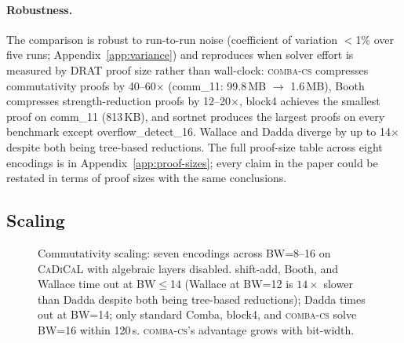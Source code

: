 \documentclass[a4paper]{ceurart}
\newcommand{\combacs}{\textsc{comba-cs}\xspace}
\newcommand{\cadical}{\textsc{CaDiCaL}\xspace}
\begin{document}
\paragraph{Robustness.}
The comparison is robust to run-to-run noise (coefficient of
variation $<$1\% over five runs; Appendix~\ref{app:variance}) and
reproduces when solver effort is measured by DRAT proof size
rather than wall-clock: \combacs compresses commutativity proofs
by 40--60$\times$ (comm\_11: 99.8\,MB $\to$ 1.6\,MB), Booth
compresses strength-reduction proofs by 12--20$\times$, block4
achieves the smallest proof on comm\_11 (813\,KB), and sortnet
produces the largest proofs on every benchmark except
overflow\_detect\_16. Wallace and Dadda diverge by up to
14$\times$ despite both being tree-based reductions. The full
proof-size table across eight encodings is in
Appendix~\ref{app:proof-sizes}; every claim in the paper could
be restated in terms of proof sizes with the same conclusions.

\subsection{Scaling}
\label{sec:scaling}

\begin{figure}[ht]
\centering
{}
\caption{Commutativity scaling: seven encodings across BW=8--16 on
  \cadical with algebraic layers disabled. shift-add, Booth, and
  Wallace time out at BW$\leq$14 (Wallace at BW=12 is $14\times$
  slower than Dadda despite both being tree-based reductions);
  Dadda times out at BW=14; only standard Comba, block4, and
  \combacs solve BW=16 within 120\,s. \combacs's advantage grows
  with bit-width.}
\label{fig:scaling}
\end{figure}
\end{document}
